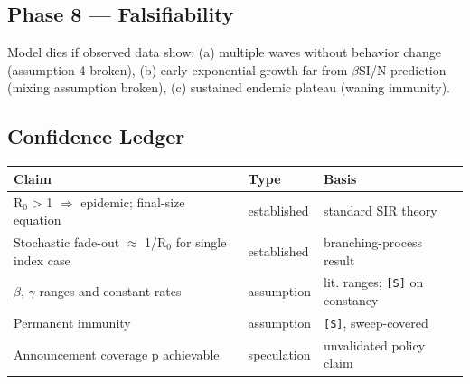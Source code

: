 \documentclass[11pt]{article}
\begin{document}
\subsection*{Phase 8 --- Falsifiability}
Model dies if observed data show: (a) multiple waves without behavior change (assumption 4 broken), (b) early exponential growth far from $\beta$SI/N prediction (mixing assumption broken), (c) sustained endemic plateau (waning immunity).\\
\subsection*{Confidence Ledger}
\begin{tabular}{lll}
\toprule
Claim & Type & Basis \\
\midrule
R$_{0}$ > 1 $\Longrightarrow$ epidemic; final-size equation & established & standard SIR theory \\
Stochastic fade-out $\approx$ 1/R$_{0}$ for single index case & established & branching-process result \\
$\beta$, $\gamma$ ranges and constant rates & assumption & lit. ranges; \texttt{[S]} on constancy \\
Permanent immunity & assumption & \texttt{[S]}, sweep-covered \\
Announcement coverage p achievable & speculation & unvalidated policy claim \\
\bottomrule
\end{tabular}
\end{document}
